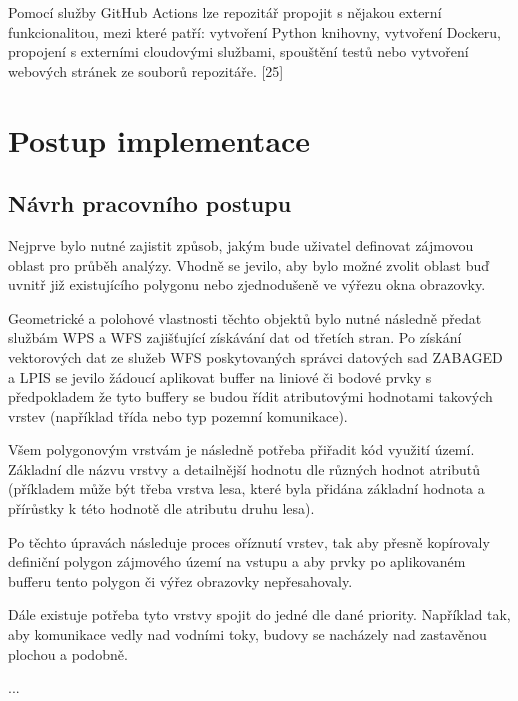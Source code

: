 \documentclass[a4paper,oneside,12pt]{book}
\begin{document}
Pomocí služby GitHub Actions lze repozitář propojit s nějakou externí funkcionalitou, mezi které patří: vytvoření Python knihovny, vytvoření Dockeru, propojení s externími cloudovými službami, spouštění testů nebo vytvoření webových stránek ze souborů repozitáře. [25]


\chapter{Postup implementace} \label{implementace}


\section{Návrh pracovního postupu} \label{workflow}
Nejprve bylo nutné zajistit způsob, jakým bude uživatel definovat zájmovou oblast pro průběh analýzy. Vhodně se jevilo, aby bylo možné zvolit oblast buď uvnitř již existujícího polygonu nebo zjednodušeně ve výřezu okna obrazovky.

Geometrické a polohové vlastnosti těchto objektů bylo nutné následně předat službám WPS a WFS zajišťující získávání dat od třetích stran. Po získání vektorových dat ze služeb WFS poskytovaných správci datových sad ZABAGED a LPIS se jevilo žádoucí aplikovat buffer na liniové či bodové prvky s předpokladem že tyto buffery se budou řídit atributovými hodnotami takových vrstev (například třída nebo typ pozemní komunikace). 

Všem polygonovým vrstvám je následně potřeba přiřadit kód využití území. Základní dle názvu vrstvy a detailnější hodnotu dle různých hodnot atributů (příkladem může být třeba vrstva lesa, které byla přidána základní hodnota a přírůstky k této hodnotě dle atributu druhu lesa).

Po těchto úpravách následuje proces oříznutí vrstev, tak aby přesně kopírovaly definiční polygon zájmového území na vstupu a aby prvky po aplikovaném bufferu tento polygon či výřez obrazovky nepřesahovaly.

Dále existuje potřeba tyto vrstvy spojit do jedné dle dané priority. Například tak, aby komunikace vedly nad vodními toky, budovy se nacházely nad zastavěnou plochou a podobně.

...
\end{document}
